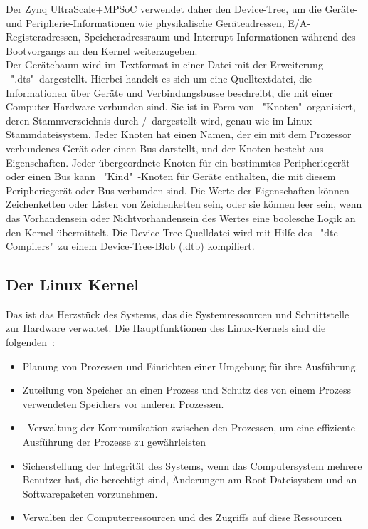 Der Zynq UltraScale+MPSoC verwendet daher den Device-Tree, um die Geräte- und Peripherie-Informationen wie physikalische Geräteadressen, E/A-Registeradressen, Speicheradressraum und Interrupt-Informationen während des Bootvorgangs an den Kernel weiterzugeben.\\
Der Gerätebaum wird im Textformat in einer Datei mit der Erweiterung \ ".dts"\ dargestellt. Hierbei handelt es sich um eine Quelltextdatei, die Informationen über Geräte und Verbindungsbusse beschreibt, die mit einer Computer-Hardware verbunden sind. Sie ist in Form von \ "Knoten"\ organisiert, deren Stammverzeichnis durch \grqq /\grqq\ dargestellt wird, genau wie im Linux-Stammdateisystem. Jeder Knoten hat einen Namen, der ein mit dem Prozessor verbundenes Gerät oder einen Bus darstellt, und der Knoten besteht aus Eigenschaften. Jeder übergeordnete Knoten für ein bestimmtes Peripheriegerät oder einen Bus kann \ "Kind"\ -Knoten für Geräte enthalten, die mit diesem Peripheriegerät oder Bus verbunden sind. Die Werte der Eigenschaften können Zeichenketten oder Listen von Zeichenketten sein, oder sie können leer sein, wenn das Vorhandensein oder Nichtvorhandensein des Wertes eine boolesche Logik an den Kernel übermittelt. Die Device-Tree-Quelldatei wird mit Hilfe des \ "dtc -Compilers"\ zu einem Device-Tree-Blob (.dtb) kompiliert.

\subsection{Der Linux Kernel}
Das ist das Herzstück des Systems, das die Systemressourcen und Schnittstelle zur Hardware verwaltet. Die Hauptfunktionen des Linux-Kernels sind die folgenden~\cite{linuxkernel.}:
\begin{itemize}
	\item Planung von Prozessen und Einrichten einer Umgebung für ihre Ausführung.
	\item  Zuteilung von Speicher an einen Prozess und Schutz des von einem Prozess verwendeten Speichers vor anderen Prozessen.
	\item \ Verwaltung der Kommunikation zwischen den Prozessen, um eine effiziente Ausführung der Prozesse zu gewährleisten
	\item Sicherstellung der Integrität des Systems, wenn das Computersystem mehrere Benutzer hat, die berechtigt sind, Änderungen am Root-Dateisystem und an Softwarepaketen vorzunehmen.	
	\item Verwalten der Computerressourcen und des Zugriffs auf diese Ressourcen
\end{itemize}

